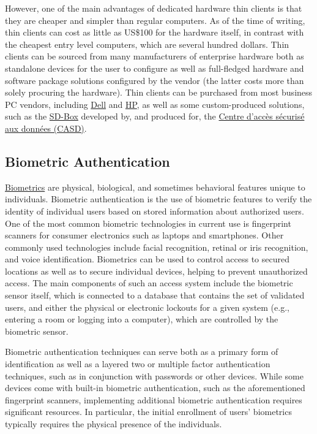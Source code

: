 However, one of the main advantages of dedicated hardware thin clients is that they are cheaper and simpler than regular computers. As of the time of writing, thin clients can cost as little as US\$100 for the hardware itself, in contrast with the cheapest entry level computers, which are several hundred dollars. Thin clients can be sourced from many manufacturers of enterprise hardware both as standalone devices for the user to configure as well as full-fledged hardware and software package solutions configured by the vendor (the latter costs more than solely procuring the hardware). Thin clients can be purchased from most business PC vendors, including \href{https://www.dell.com/en-us/work/shop/wyse-endpoints-and-software/sc/cloud-client/thin-clients}{Dell} and \href{https://www8.hp.com/us/en/cloud-computing/thin-clients.html}{HP}, as well as some custom-produced solutions, such as the \href{https://www.casd.eu/en/technologie/sd-box}{SD-Box} developed by, and produced for, the \href{https://www.casd.eu/en}{Centre d'accès sécurisé aux données (CASD)}.

\hypertarget{biometric-authentication}{%
\subsection{Biometric Authentication}\label{biometric-authentication}}

\href{https://csrc.nist.gov/glossary/term/biometric}{Biometrics} are physical, biological, and sometimes behavioral features unique to individuals. Biometric authentication is the use of biometric features to verify the identity of individual users based on stored information about authorized users. One of the most common biometric technologies in current use is fingerprint scanners for consumer electronics such as laptops and smartphones. Other commonly used technologies include facial recognition, retinal or iris recognition, and voice identification. Biometrics can be used to control access to secured locations as well as to secure individual devices, helping to prevent unauthorized access. The main components of such an access system include the biometric sensor itself, which is connected to a database that contains the set of validated users, and either the physical or electronic lockouts for a given system (e.g., entering a room or logging into a computer), which are controlled by the biometric sensor.

Biometric authentication techniques can serve both as a primary form of identification as well as a layered two or multiple factor authentication techniques, such as in conjunction with passwords or other devices. While some devices come with built-in biometric authentication, such as the aforementioned fingerprint scanners, implementing additional biometric authentication requires significant resources. In particular, the initial enrollment of users' biometrics typically requires the physical presence of the individuals.

